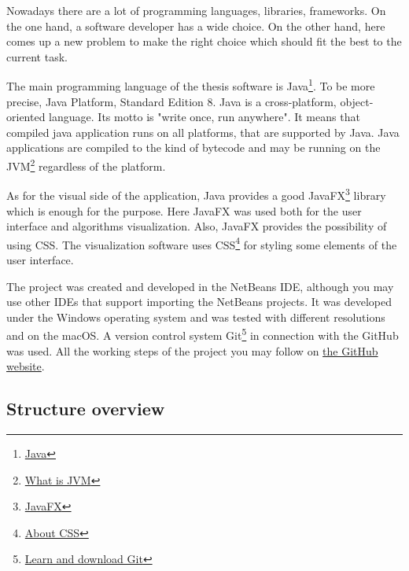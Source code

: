 \documentclass[
  field=inf,
  biblatex,
  language=english,
  glossaries,
  theorems=false,
  sourcecodes=false,
  index
]{kidiplom}
\begin{document}
Nowadays there are a lot of programming languages, libraries, frameworks. On the one hand, a software developer has a wide choice. On the other hand, here comes up a new problem to make the right choice which should fit the best to the current task.

The main programming language of the thesis software is Java\footnote{\href{https://docs.oracle.com/javase/tutorial/getStarted/intro/definition.html}{Java}}. To be more precise, Java Platform, Standard Edition 8. Java is a cross-platform, object-oriented language. Its motto is "write once, run anywhere". It means that compiled java application runs on all platforms, that are supported by Java. Java applications are compiled to the kind of bytecode and may be running on the \Gls{JVM}\footnote{\href{https://www.geeksforgeeks.org/jvm-works-jvm-architecture/}{What is JVM}} regardless of the platform. 

As for the visual side of the application, Java provides a good JavaFX\footnote{\href{https://docs.oracle.com/javase/8/javafx/get-started-tutorial/jfx-overview.htm}{JavaFX}} library which is enough for the purpose. Here JavaFX was used both for the user interface and algorithms visualization. Also, JavaFX provides the possibility of using \Gls{CSS}. The visualization software uses \Gls{CSS}\footnote{\href{https://www.w3schools.com/css/default.asp}{About CSS}} for styling some elements of the user interface.

The project was created and developed in the NetBeans IDE, although you may use other IDEs that support importing the NetBeans projects. It was developed under the Windows operating system and was tested with different resolutions and on the macOS. A version control system Git\footnote{\href{https://git-scm.com/}{Learn and download Git}} in connection with the GitHub was used. All the working steps of the project you may follow on \href{https://github.com/klnmi97/Sorting-Visualization}{the GitHub website}.

\newpage
\subsection{Structure overview}
\end{document}
